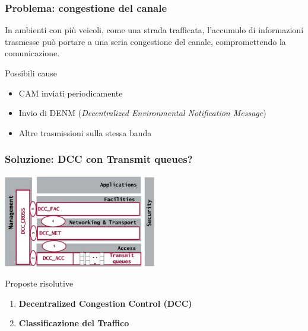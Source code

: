 \documentclass[aspectratio=169]{beamer}
\begin{document}
\begin{frame}
    \frametitle{Problema: congestione del canale}
    In ambienti con più veicoli, come una strada trafficata, l'accumulo di informazioni trasmesse può portare a una \alert{seria congestione del canale}, compromettendo la comunicazione.
    \vfill
    \begin{block}{Possibili cause}
        \begin{itemize}
            \vspace{5pt}
            \item {CAM inviati periodicamente}
            \vspace{5pt}
            \item {Invio di DENM (\textit{Decentralized Environmental Notification Message})}
            \vspace{5pt}
            \item {Altre trasmissioni sulla stessa banda}
            \vspace{5pt}
        \end{itemize}
    \end{block}
    
\end{frame}

\begin{frame}
    \frametitle{Soluzione: DCC con Transmit queues?}
    \centering
    \vfill
    \includegraphics[width=0.5\textwidth]{dcc_edca.jpg}
    \vfill
    \begin{block}{Proposte risolutive}
        \begin{enumerate}
            \vspace{5pt}
            \item \textbf{Decentralized Congestion Control (DCC)}
            \vspace{5pt}
            \item \textbf{Classificazione del Traffico}
            \vspace{5pt}
        \end{enumerate}
    \end{block}
    \vfill
\end{frame}
\end{document}
